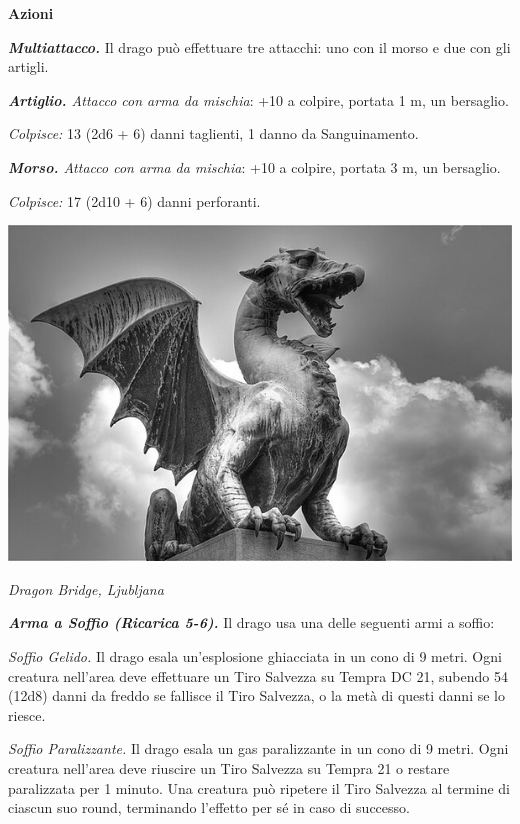 \begin{multicols}{2}
{\textbf{Azioni}

\emph{\textbf{Multiattacco.}} Il drago può effettuare tre attacchi: uno con il morso e due con gli artigli.

\emph{\textbf{Artiglio.} Attacco con arma da mischia}: +10 a colpire, portata 1 m, un bersaglio.

\emph{Colpisce:} 13 (2d6 + 6) danni taglienti, 1 danno da Sanguinamento.

\emph{\textbf{Morso.} Attacco con arma da mischia}: +10 a colpire, portata 3 m, un bersaglio.

\emph{Colpisce:} 17 (2d10 + 6) danni perforanti.



\medskip

\begin{center}
	\includegraphics[width=0.9\linewidth]{immagini/Dragon_Ljubljana.png}

	\emph{Dragon Bridge, Ljubljana}
\end{center}

\emph{\textbf{Arma a Soffio (Ricarica 5-6).}} Il drago usa una delle seguenti armi a soffio:

\emph{Soffio Gelido.} Il drago esala un'esplosione ghiacciata in un cono di 9 metri. Ogni creatura nell'area deve effettuare un Tiro Salvezza su Tempra DC 21, subendo 54 (12d8) danni da freddo se fallisce il Tiro Salvezza, o la metà di questi danni se lo riesce.

\emph{Soffio Paralizzante.} Il drago esala un gas paralizzante in un cono di 9 metri. Ogni creatura nell'area deve riuscire un Tiro Salvezza su Tempra 21 o restare paralizzata per 1 minuto. Una creatura può ripetere il Tiro Salvezza al termine di ciascun suo round, terminando l'effetto per sé in caso di successo.

}
\end{multicols}
